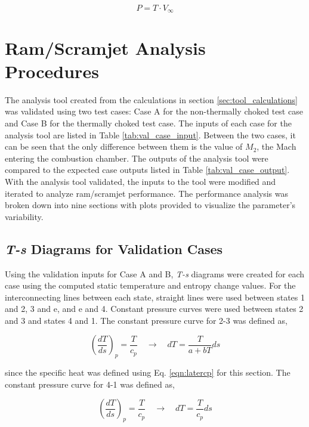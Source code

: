 \documentclass[conf]{new-aiaa} %
\begin{document}
\begin{equation}
    \label{eqn:P}
    P=T\cdot V_\infty
\end{equation}


\section{Ram/Scramjet Analysis Procedures} \label{sec:ram_scramjet_analysis_procedures}
The analysis tool created from the calculations in section \ref{sec:tool_calculations} was validated using two test cases: Case A for the non-thermally choked test case and Case B for the thermally choked test case. The inputs of each case for the analysis tool are listed in Table \ref{tab:val_case_input}. Between the two cases, it can be seen that the only difference between them is the value of $M_2$, the Mach entering the combustion chamber. The outputs of the analysis tool were compared to the expected case outputs listed in Table \ref{tab:val_case_output}. With the analysis tool validated, the inputs to the tool were modified and iterated to analyze ram/scramjet performance. The performance analysis was broken down into nine sections with plots provided to visualize the parameter's variability.

\subsection{\textit{T-s} Diagrams for Validation Cases} %
Using the validation inputs for Case A and B, \textit{T-s} diagrams were created for each case using the computed static temperature and entropy change values. For the interconnecting lines between each state, straight lines were used between states 1 and 2, 3 and e, and e and 4. Constant pressure curves were used between states 2 and 3 and states 4 and 1. The constant pressure curve for 2-3 was defined as,

\begin{equation}
    \label{eqn:constp_23}
    \left(\frac{dT}{ds}\right)_p=\frac{T}{c_p} \quad \rightarrow \quad dT=\frac{T}{a+bT}ds
\end{equation}

since the specific heat was defined using Eq. \ref{eqn:latercp} for this section. The constant pressure curve for 4-1 was defined as,

\begin{equation}
    \label{eqn:constp_41}
    \left(\frac{dT}{ds}\right)_p=\frac{T}{c_p} \quad \rightarrow \quad dT=\frac{T}{c_p}ds
\end{equation}
\end{document}
